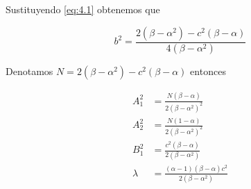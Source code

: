 \documentclass[letterpaper,11pt]{exam}
\theoremstyle{plain}
\begin{document}
Sustituyendo \eqref{eq:4.1} obtenemos que 

\begin{equation}
    b^2=\frac{2(\beta-\alpha^2)-c^2(\beta-\alpha)}{4(\beta-\alpha^2)}
\end{equation}

Denotamos $N=2(\beta-\alpha^2)-c^2(\beta-\alpha)$ entonces

\begin{align*}
    A_1^2&=\frac{N(\beta-\alpha)}{2(\beta-\alpha^2)^2} \\
    A_2^2&=\frac{N(1-\alpha)}{2(\beta-\alpha^2)^2} \\
    B_1^2&=\frac{c^2(\beta-\alpha)}{2(\beta-\alpha^2)} \\
    \lambda&=\frac{(\alpha-1)(\beta-\alpha)c^2}{2(\beta-\alpha^2)}
\end{align*}
\end{document}
